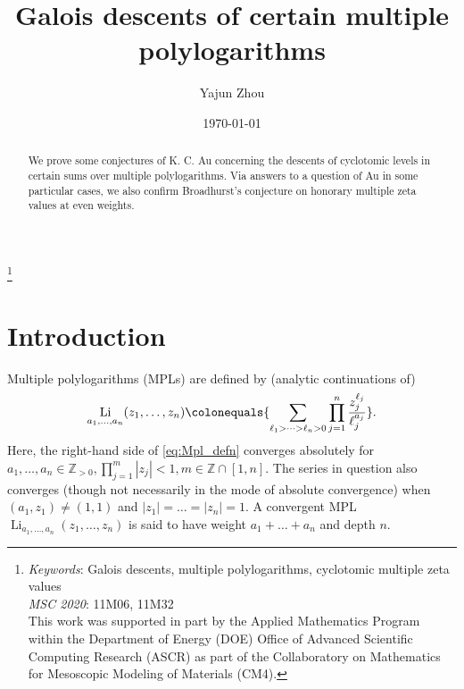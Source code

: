 \documentclass[final,notitlepage,12pt,reqno]{amsart}
\DeclareMathOperator{\Li}{Li}
\theoremstyle{plain}
\theoremstyle{definition}
\numberwithin{equation}{section}
\begin{document}
\title{Galois descents of certain multiple polylogarithms}\author{Yajun Zhou}
\address{Program in Applied and Computational Mathematics (PACM), Princeton University, Princeton, NJ 08544} 

\date{\today}\thanks{\textit{Keywords}: Galois descents, multiple polylogarithms, cyclotomic multiple zeta values\\\indent\textit{MSC 2020}: 11M06, 11M32\\\indent * This work was supported in part  by the Applied Mathematics Program within the Department of Energy
(DOE) Office of Advanced Scientific Computing Research (ASCR) as part of the Collaboratory on
Mathematics for Mesoscopic Modeling of Materials (CM4).}



\begin{abstract}We prove some conjectures of K. C. Au concerning the  descents of cyclotomic levels in certain sums over multiple polylogarithms. Via answers to a question of Au in some particular cases, we also confirm Broadhurst's conjecture on honorary multiple zeta values at even weights. \end{abstract}

\maketitle

\section{Introduction\label{sec:intro}}
Multiple polylogarithms (MPLs)  are defined by (analytic continuations of) \begin{align}
\Li_{a_1,\dots,a_n}(z_1,\dots,z_n)\colonequals {\sum\limits_{\ell_{1}>\dots>\ell_{n}>0}\prod\limits_{j=1}^n\frac{\smash[t]{z_{j}^{\ell_{j}}}}{\ell_j^{a_j}}}.\label{eq:Mpl_defn}
\end{align} Here, the right-hand side of \eqref{eq:Mpl_defn}  converges absolutely  for  $ a_1,\dots,a_n\in\mathbb Z_{>0}, \prod_{j=1}^m|z_j|<1,m\in\mathbb Z\cap[1,n]$. The series in question also converges (though not necessarily in the mode of absolute convergence) when  $ (a_1,z_1)\neq(1,1)$ and $ |z_1|=\dots=|z_n|=1$. A convergent MPL $ \Li_{a_1,\dots,a_n}(z_1,\dots,z_n)$ is said to have weight $ a_1+\dots+a_n$ and depth $n$.
\end{document}
